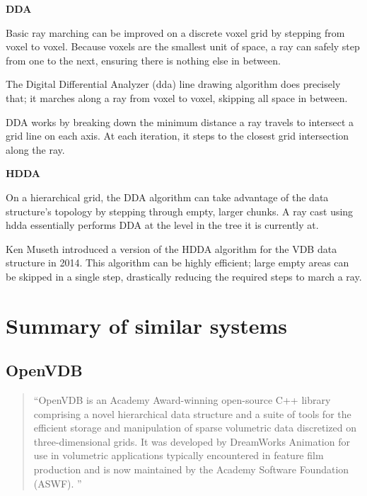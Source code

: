 \vspace{0.5cm}
\label{def:dda}
\textbf{DDA}

Basic ray marching can be improved on a discrete voxel grid by stepping from voxel to voxel. Because voxels are the smallest unit of space, a ray can safely step from one to the next, ensuring there is nothing else in between.

The Digital Differential Analyzer (\acrshort{dda}) line drawing algorithm does precisely that; it marches along a ray from voxel to voxel, skipping all space in between.

DDA works by breaking down the minimum distance a ray travels to intersect a grid line on each axis.
At each iteration, it steps to the closest grid intersection along the ray.

\vspace{0.5cm}
\label{def:hdda}
\textbf{HDDA}

On a hierarchical grid, the DDA algorithm can take advantage of the data structure's topology by stepping through empty, larger chunks.
A ray cast using \acrshort{hdda} essentially performs DDA at the level in the tree it is currently at.

Ken Museth introduced a version of the HDDA algorithm for the VDB data structure in 2014\supercite{vdb2014}.
This algorithm can be highly efficient; large empty areas can be skipped in a single step, drastically reducing the required steps to march a ray.

\section{Summary of similar systems}
\subsection{OpenVDB\supercite{openvdb:doc}}

\begin{quote}
``OpenVDB is an Academy Award-winning open-source C++ library comprising a novel hierarchical data structure and a suite of tools for the efficient storage and manipulation of sparse volumetric data discretized on three-dimensional grids. It was developed by DreamWorks Animation for use in volumetric applications typically encountered in feature film production and is now maintained by the Academy Software Foundation (ASWF).
''
\end{quote}

